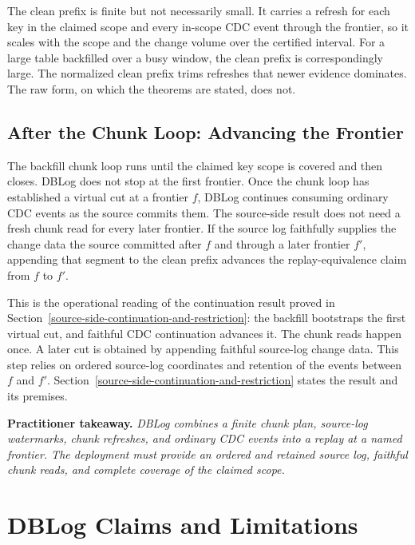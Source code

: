 \documentclass[letterpaper,10pt,twocolumn]{article}
\begin{document}
The clean prefix is finite but not necessarily small. It carries a
refresh for each key in the claimed scope and every in-scope CDC event
through the frontier, so it scales with the scope and the change
volume over the certified interval. For a large table backfilled
over a busy window, the clean prefix is correspondingly large. The
normalized clean prefix trims refreshes that newer evidence dominates.
The raw form, on which the theorems are stated, does not.

\subsection{After the Chunk Loop: Advancing the
Frontier}\label{after-the-chunk-loop}

The backfill chunk loop runs until the claimed key scope is covered and
then closes. DBLog does not stop at the first frontier. Once the chunk
loop has established a virtual
cut at a frontier $f$, DBLog continues consuming ordinary CDC events as
the source commits them. The source-side
result does not need a fresh chunk read for every later frontier. If the
source log faithfully supplies the change data the source committed
after $f$ and through a later frontier $f'$, appending that segment to
the clean prefix advances the replay-equivalence claim from $f$ to $f'$.

This is the operational reading of the continuation result proved in
Section~\ref{source-side-continuation-and-restriction}: the backfill
bootstraps the first virtual cut, and faithful CDC continuation advances
it. The chunk reads happen once. A later cut is obtained by appending
faithful source-log change data. This step relies on ordered source-log
coordinates and retention of the events between $f$ and $f'$.
Section~\ref{source-side-continuation-and-restriction} states the result
and its premises.

\smallskip
\noindent\textbf{Practitioner takeaway.} \emph{DBLog combines a finite
chunk plan, source-log watermarks, chunk refreshes, and ordinary CDC
events into a replay at a named frontier. The deployment must provide
an ordered and retained source log, faithful chunk reads, and complete
coverage of the claimed scope.}

\section{DBLog Claims and
Limitations}\label{what-dblog-is-what-it-is-not-and-its-limitations}
\end{document}
